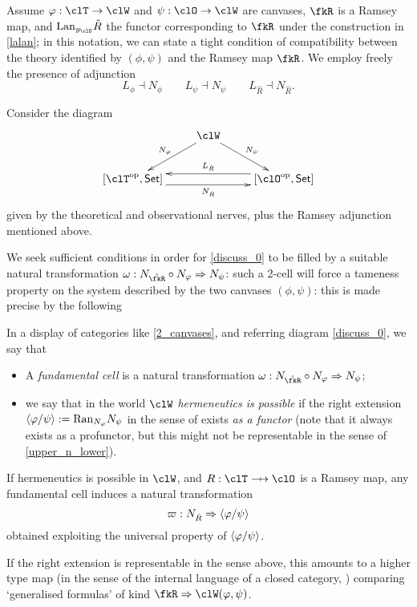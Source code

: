 Assume $\phi : \clT \to \clW$ and $\psi : \clO \to \clW$ are canvases, $\fkR$ is a Ramsey map, and $\Lan_{y_{\clO}}\hat R$ the functor corresponding to $\fkR$ under the construction in \eqref{lalan}; in this notation, we can state a tight condition of compatibility between the theory identified by $(\phi,\psi)$ and the Ramsey map $\fkR$. We employ freely the presence of adjunction
\[L_\phi\dashv N_\phi \qquad
  L_\psi \dashv N_\psi \qquad
  L_{\hat R} \dashv N_{\hat R}.\]
\begin{remark}\label{inducing_herme}
  Consider the diagram
  \[ \vcenter{\xymatrix{
    & \clW \ar[dl]_{N_\phi} \ar[dr]^{N_\psi} & \\
    [\clT^\op,\Set] \ar@<-.5em>[rr]_{N_{\hat R}} && \ar@<-.5em>[ll]_{L_{\hat R}} [\clO^\op,\Set]
    }}   \label{discuss_0}\]
  given by the theoretical and observational nerves, plus the Ramsey adjunction mentioned above.
\end{remark}
We seek sufficient conditions in order for \eqref{discuss_0} to be filled by a suitable natural transformation $\omega : N_{\hat \fkR} \circ N_\phi \To N_\psi$: such a 2-cell will force a tameness property on the system described by the two canvases $(\phi,\psi)$: this is made precise by the following
\begin{definition}\label{funcell_herme}
  In a display of categories like \eqref{2_canvases}, and referring diagram \eqref{discuss_0}, we say that
  \begin{itemize}
    \item A \emph{fundamental cell} is a natural transformation $\omega : N_{\hat \fkR} \circ N_\phi \To N_\psi$;
    \item we say that in the world $\clW$ \emph{hermeneutics is possible} if the right extension $\langle \varphi/\psi\rangle := \mathrm{Ran}_{ N_\varphi}N_\psi$ in the sense of \cite[§3.7]{Borceux1994} exists \emph{as a functor} (note that it always exists as a profunctor, but this might not be representable in the sense of \autoref{upper_n_lower}).
  \end{itemize}
  If hermeneutics is possible in $\clW$, and $R : \clT \pto \clO$ is a Ramsey map, any fundamental cell induces a natural transformation
  \[ \varpi : N_{\hat R} \Rightarrow \langle \varphi/\psi\rangle \]
  obtained exploiting the universal property of $\langle \varphi/\psi\rangle$.
\end{definition}
If the right extension is representable in the sense above, this amounts to a higher type map (in the sense of the internal language of a closed category, \cite{Eilenberg1966}) comparing `generalised formulas' of kind $\fkR \To \clW(\phi,\psi)$.
